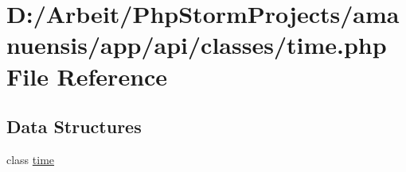 \hypertarget{a00077}{}\section{D\+:/\+Arbeit/\+Php\+Storm\+Projects/amanuensis/app/api/classes/time.php File Reference}
\label{a00077}
\subsection*{Data Structures}
\begin{DoxyCompactItemize}
\item 
class \hyperlink{a00047}{time}
\end{DoxyCompactItemize}
